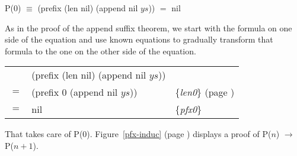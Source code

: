 \begin{center}
P($0$) $\equiv$ (prefix (len nil) (append nil $ys$)) $=$ nil
\end{center}

As in the proof of the append suffix theorem, we start with the formula on one side of the equation and use known equations to gradually transform that formula to the one on the other side of the equation.

\begin{center}
\begin{tabular}{lll}
    & (prefix (len nil) (append nil $ys$))  &                                                      \\
$=$ & (prefix 0 (append nil $ys$))          & \{\emph{len0}\} (page \pageref{len-equations})   \\
$=$ & nil                                   & \{\emph{pfx0}\}                                      \\
\end{tabular}
\end{center}

That takes care of P(0). Figure~\ref{pfx-induc} (page \pageref{pfx-induc}) displays a proof of P($n$) $\rightarrow$ P($n+1$).

